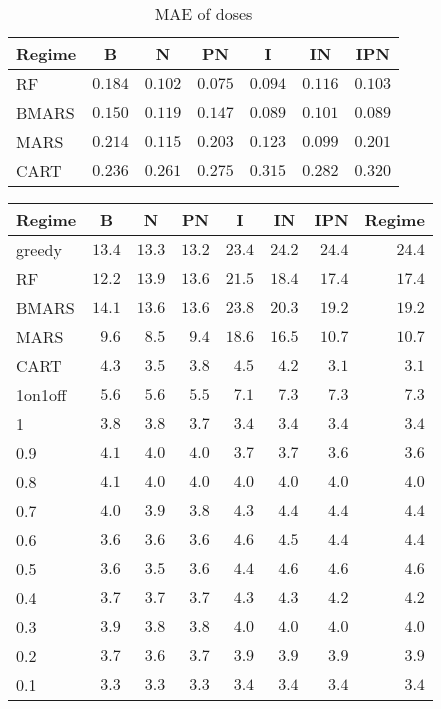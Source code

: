 \documentclass[12pt]{article}
\begin{document}
\begin{table}[H]
\caption{MAE of doses}
\begin{center}
\begin{tabular}{lrrrrrr}
\toprule
\multicolumn{1}{c}{Regime}&\multicolumn{1}{c}{B}&\multicolumn{1}{c}{N}&\multicolumn{1}{c}{PN}&\multicolumn{1}{c}{I}&\multicolumn{1}{c}{IN}&\multicolumn{1}{c}{IPN}\tabularnewline
\midrule
RF&$0.184$&$0.102$&$0.075$&$0.094$&$0.116$&$0.103$\tabularnewline
BMARS&$0.150$&$0.119$&$0.147$&$0.089$&$0.101$&$0.089$\tabularnewline
MARS&$0.214$&$0.115$&$0.203$&$0.123$&$0.099$&$0.201$\tabularnewline
CART&$0.236$&$0.261$&$0.275$&$0.315$&$0.282$&$0.320$\tabularnewline
\bottomrule
\end{tabular}\end{center}
\end{table}


\begin{table}[H]
\begin{center}
\begin{tabular}{lrrrrrrr}
\toprule
\multicolumn{1}{c}{Regime}&\multicolumn{1}{c}{B}&\multicolumn{1}{c}{N}&\multicolumn{1}{c}{PN}&\multicolumn{1}{c}{I}&\multicolumn{1}{c}{IN}&\multicolumn{1}{c}{IPN}&\multicolumn{1}{c}{Regime}\tabularnewline
\midrule
greedy&$13.4$&$13.3$&$13.2$&$23.4$&$24.2$&$24.4$&$24.4$\tabularnewline
RF&$12.2$&$13.9$&$13.6$&$21.5$&$18.4$&$17.4$&$17.4$\tabularnewline
BMARS&$14.1$&$13.6$&$13.6$&$23.8$&$20.3$&$19.2$&$19.2$\tabularnewline
MARS&$ 9.6$&$ 8.5$&$ 9.4$&$18.6$&$16.5$&$10.7$&$10.7$\tabularnewline
CART&$ 4.3$&$ 3.5$&$ 3.8$&$ 4.5$&$ 4.2$&$ 3.1$&$ 3.1$\tabularnewline
1on1off&$ 5.6$&$ 5.6$&$ 5.5$&$ 7.1$&$ 7.3$&$ 7.3$&$ 7.3$\tabularnewline
1&$ 3.8$&$ 3.8$&$ 3.7$&$ 3.4$&$ 3.4$&$ 3.4$&$ 3.4$\tabularnewline
0.9&$ 4.1$&$ 4.0$&$ 4.0$&$ 3.7$&$ 3.7$&$ 3.6$&$ 3.6$\tabularnewline
0.8&$ 4.1$&$ 4.0$&$ 4.0$&$ 4.0$&$ 4.0$&$ 4.0$&$ 4.0$\tabularnewline
0.7&$ 4.0$&$ 3.9$&$ 3.8$&$ 4.3$&$ 4.4$&$ 4.4$&$ 4.4$\tabularnewline
0.6&$ 3.6$&$ 3.6$&$ 3.6$&$ 4.6$&$ 4.5$&$ 4.4$&$ 4.4$\tabularnewline
0.5&$ 3.6$&$ 3.5$&$ 3.6$&$ 4.4$&$ 4.6$&$ 4.6$&$ 4.6$\tabularnewline
0.4&$ 3.7$&$ 3.7$&$ 3.7$&$ 4.3$&$ 4.3$&$ 4.2$&$ 4.2$\tabularnewline
0.3&$ 3.9$&$ 3.8$&$ 3.8$&$ 4.0$&$ 4.0$&$ 4.0$&$ 4.0$\tabularnewline
0.2&$ 3.7$&$ 3.6$&$ 3.7$&$ 3.9$&$ 3.9$&$ 3.9$&$ 3.9$\tabularnewline
0.1&$ 3.3$&$ 3.3$&$ 3.3$&$ 3.4$&$ 3.4$&$ 3.4$&$ 3.4$\tabularnewline
\bottomrule
\end{tabular}\end{center}
\end{table}
\end{document}
